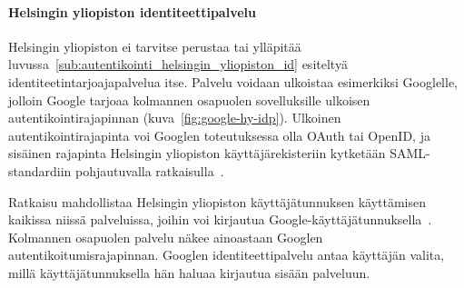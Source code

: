 \documentclass[finnish,gradu]{tktltiki}
\begin{document}



  \paragraph{Helsingin yliopiston identiteettipalvelu} \hfill %
  \label{par:helsingin_yliopiston_identiteettipalvelu}

  Helsingin yliopiston ei tarvitse perustaa tai ylläpitää luvussa~\ref{sub:autentikointi_helsingin_yliopiston_id} esiteltyä identiteetintarjoajapalvelua itse. Palvelu voidaan ulkoistaa esimerkiksi Googlelle, jolloin Google tarjoaa kolmannen osapuolen sovelluksille ulkoisen autentikointirajapinnan (kuva~\ref{fig:google-hy-idp}). Ulkoinen autentikointirajapinta voi Googlen toteutuksessa olla OAuth tai OpenID, ja sisäinen rajapinta Helsingin yliopiston käyttäjärekisteriin kytketään SAML-standardiin pohjautuvalla ratkaisulla~\cite{google_saml_doc}.

   Ratkaisu mahdollistaa Helsingin yliopiston käyttäjätunnuksen käyttämisen kaikissa niissä palveluissa, joihin voi kirjautua Google-käyttäjätunnuksella~\cite{google_shibboleth_doc}. Kolmannen osapuolen palvelu näkee ainoastaan Googlen autentikoitumisrajapinnan. Googlen identiteettipalvelu antaa käyttäjän valita, millä käyttäjätunnuksella hän haluaa kirjautua sisään palveluun.
\end{document}
